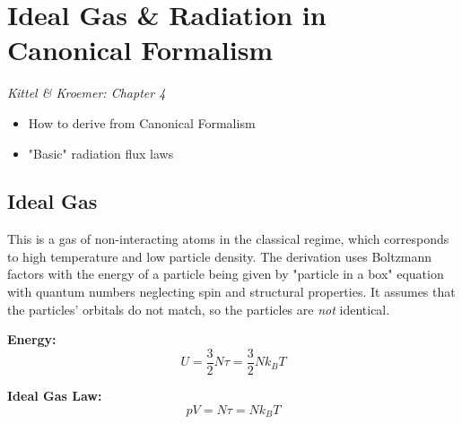 \section{Ideal Gas \& Radiation in Canonical Formalism}

\emph{Kittel \& Kroemer: Chapter 4}
\begin{itemize}
    \item How to derive from Canonical Formalism
    \item "Basic" radiation flux laws
\end{itemize}

\subsection{Ideal Gas}
This is a gas of non-interacting atoms in the classical regime, which corresponds to high temperature and low particle density. The derivation uses Boltzmann factors with the energy of a particle being given by "particle in a box" equation with quantum numbers neglecting spin and structural properties. It assumes that the particles' orbitals do not match, so the particles are \emph{not} identical.

\textbf{Energy:} 
\[
U=\frac{3}{2} N \tau = \frac{3}{2} N k_B T
\]

\textbf{Ideal Gas Law:} 
\[
pV = N\tau = N k_B T
\]

